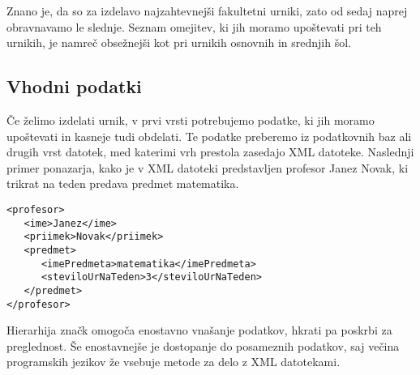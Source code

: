 \documentclass[a4paper,10pt]{article}
\begin{document}
Znano je, da so za izdelavo najzahtevnejši fakultetni urniki, zato od sedaj naprej
obravnavamo le slednje. Seznam omejitev, ki jih moramo upoštevati pri teh urnikih,
je namreč obsežnejši kot pri urnikih osnovnih in srednjih šol.
\subsection{Vhodni podatki}
Če želimo izdelati urnik, v prvi vrsti potrebujemo podatke, ki jih moramo upoštevati in
kasneje tudi obdelati. Te podatke preberemo iz podatkovnih baz ali drugih vrst datotek,
med katerimi vrh prestola zasedajo XML datoteke. Naslednji primer ponazarja, kako je v
XML datoteki predstavljen profesor Janez Novak, ki trikrat na teden predava predmet
matematika.
\begin{verbatim}
<profesor>
   <ime>Janez</ime>
   <priimek>Novak</priimek>
   <predmet>
      <imePredmeta>matematika</imePredmeta>
      <steviloUrNaTeden>3</steviloUrNaTeden>
   </predmet>
</profesor>
\end{verbatim}
Hierarhija značk omogoča enostavno vnašanje podatkov, hkrati pa poskrbi za preglednost.
Še enostavnejše je dostopanje do posameznih podatkov, saj večina programskih jezikov že
vsebuje metode za delo z XML datotekami.
\end{document}
